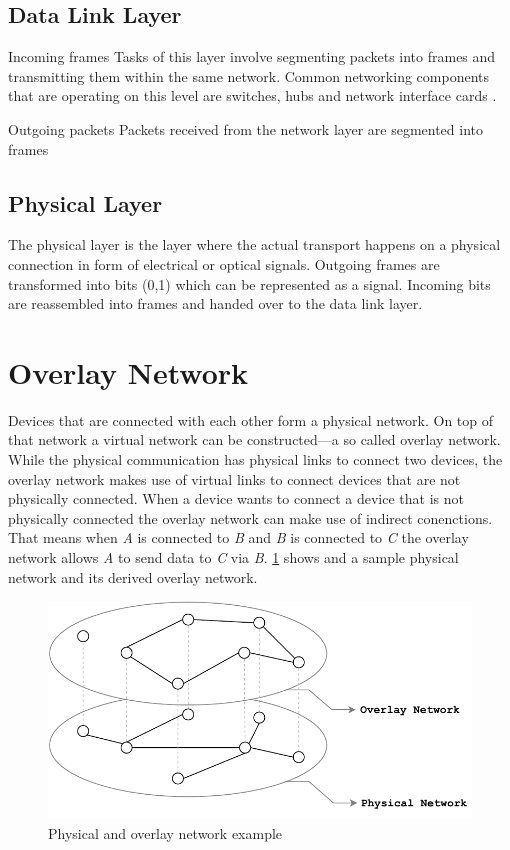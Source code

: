 \subsection{Data Link Layer}
Incoming frames\newline
Tasks of this layer involve segmenting packets into frames and transmitting them within the same network.
Common networking components that are operating on this level are switches, hubs and network interface cards \cite{simoneau2006}.

Outgoing packets\newline
Packets received from the network layer are segmented into frames 

\subsection{Physical Layer}
The physical layer is the layer where the actual transport happens on a physical connection in form of electrical or optical signals.
Outgoing frames are transformed into bits (0,1) which can be represented as a signal.
Incoming bits are reassembled into frames and handed over to the data link layer.


\section{Overlay Network}
Devices that are connected with each other form a physical network. On top of that network a virtual network can be constructed—a so called overlay network.
While the physical communication has physical links to connect two devices, the overlay network makes use of virtual links to connect devices that are not physically connected. When a device wants to connect a device that is not physically connected the overlay network can make use of indirect conenctions. That means when \textit{A} is connected to \textit{B} and \textit{B} is connected to \textit{C} the overlay network allows \textit{A} to send data to \textit{C} via \textit{B}.
\cref{fig:overlay} shows and a sample physical network and its derived overlay network.

\begin{figure}
\centering
\includegraphics[width=.5\textwidth]{graphics/physical-vs-overlay-network.pdf}
\caption{Physical and overlay network example}
\label{fig:overlay}
\end{figure}
